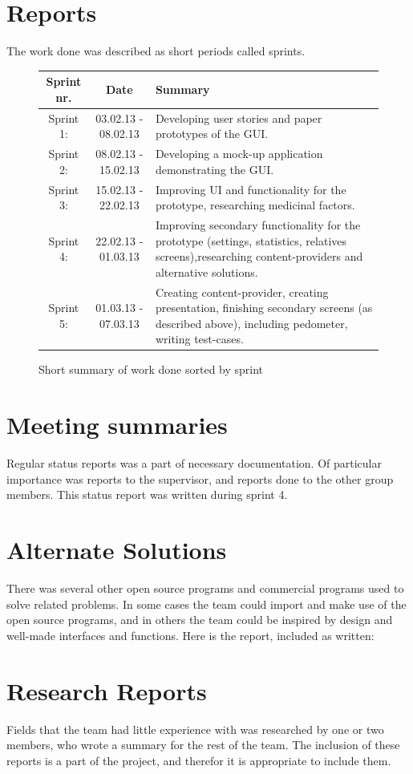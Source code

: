 \section{Reports}
The work done was described as short periods called sprints. 
\begin{figure}
\caption{Short summary of work done sorted by sprint}
\begin{tabular}{|c|c|p{7cm}|}
\hline
Sprint nr. & Date & Summary\\
\hline
Sprint 1: & 03.02.13 - 08.02.13 & Developing user stories and paper prototypes of the GUI.\\ 
\hline
Sprint 2: & 08.02.13 - 15.02.13 & Developing a mock-up application demonstrating the GUI.\\
\hline
Sprint 3: & 15.02.13 - 22.02.13 & Improving UI and functionality for the prototype, researching medicinal factors. \\
\hline
Sprint 4: & 22.02.13 - 01.03.13 & Improving secondary functionality for the prototype (settings, statistics, relatives screens),researching content-providers and alternative solutions. \\
\hline
Sprint 5: & 01.03.13 - 07.03.13 & Creating content-provider, creating presentation, finishing secondary screens (as described above), including pedometer, writing test-cases.\\
\hline
\end{tabular} 
\label{tab:sprintList}
\end{figure}
\newpage

\section{Meeting summaries}
Regular status reports was a part of necessary documentation. Of particular importance was reports to the supervisor, and reports done to the other group members. This status report was written during sprint 4.






\section{Alternate Solutions}
There was several other open source programs and commercial programs used to solve related problems. In some cases the team could import and make use of the open source programs, and in others the team could be inspired by design and well-made interfaces and functions. Here is the report, included as written:


\section{Research Reports}
Fields that the team had little experience with was researched by one or two members, who wrote a summary for the rest of the team. The inclusion of these reports is a part of the project, and therefor it is appropriate to include them. 




